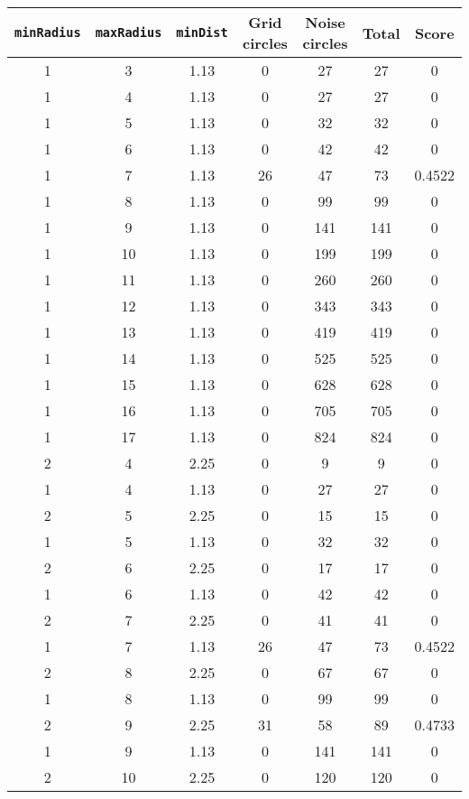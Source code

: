 \documentclass[letterpaper, 12pt]{article}
\begin{document}
\begin{longtable}{|c|c|c|c|c|c|c|}
\hline
\textbf{\texttt{minRadius}} & \textbf{\texttt{maxRadius}} & \textbf{\texttt{minDist}} & \textbf{Grid circles} & \textbf{Noise circles} & \textbf{Total} & \textbf{Score} \\
\hline
1 & 3 & 1.13 & 0 & 27 & 27 & 0 \\
\hline
1 & 4 & 1.13 & 0 & 27 & 27 & 0 \\
\hline
1 & 5 & 1.13 & 0 & 32 & 32 & 0 \\
\hline
1 & 6 & 1.13 & 0 & 42 & 42 & 0 \\
\hline
1 & 7 & 1.13 & 26 & 47 & 73 & 0.4522 \\
\hline
1 & 8 & 1.13 & 0 & 99 & 99 & 0 \\
\hline
1 & 9 & 1.13 & 0 & 141 & 141 & 0 \\
\hline
1 & 10 & 1.13 & 0 & 199 & 199 & 0 \\
\hline
1 & 11 & 1.13 & 0 & 260 & 260 & 0 \\
\hline
1 & 12 & 1.13 & 0 & 343 & 343 & 0 \\
\hline
1 & 13 & 1.13 & 0 & 419 & 419 & 0 \\
\hline
1 & 14 & 1.13 & 0 & 525 & 525 & 0 \\
\hline
1 & 15 & 1.13 & 0 & 628 & 628 & 0 \\
\hline
1 & 16 & 1.13 & 0 & 705 & 705 & 0 \\
\hline
1 & 17 & 1.13 & 0 & 824 & 824 & 0 \\
\hline
2 & 4 & 2.25 & 0 & 9 & 9 & 0 \\
\hline
1 & 4 & 1.13 & 0 & 27 & 27 & 0 \\
\hline
2 & 5 & 2.25 & 0 & 15 & 15 & 0 \\
\hline
1 & 5 & 1.13 & 0 & 32 & 32 & 0 \\
\hline
2 & 6 & 2.25 & 0 & 17 & 17 & 0 \\
\hline
1 & 6 & 1.13 & 0 & 42 & 42 & 0 \\
\hline
2 & 7 & 2.25 & 0 & 41 & 41 & 0 \\
\hline
1 & 7 & 1.13 & 26 & 47 & 73 & 0.4522 \\
\hline
2 & 8 & 2.25 & 0 & 67 & 67 & 0 \\
\hline
1 & 8 & 1.13 & 0 & 99 & 99 & 0 \\
\hline
2 & 9 & 2.25 & 31 & 58 & 89 & 0.4733 \\
\hline
1 & 9 & 1.13 & 0 & 141 & 141 & 0 \\
\hline
2 & 10 & 2.25 & 0 & 120 & 120 & 0 \\

\end{longtable}
\end{document}
